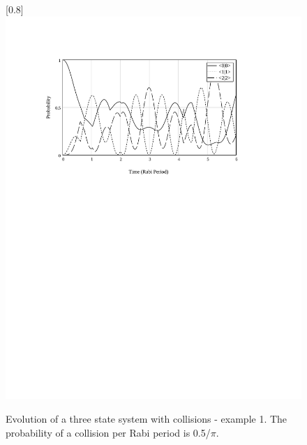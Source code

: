 \begin{figure}
\scalebox{0.8}[0.8]{
\includegraphics[bb=30 455 489 685]
{coll_1/coll_1.pdf}
}
\caption[Evolution of a three state system with collisions - example 1]{Evolution of a three state system with collisions - example 1. The probability of a collision per Rabi period is 0.5/$\pi$.}
\label{coll_1}
\end{figure}
